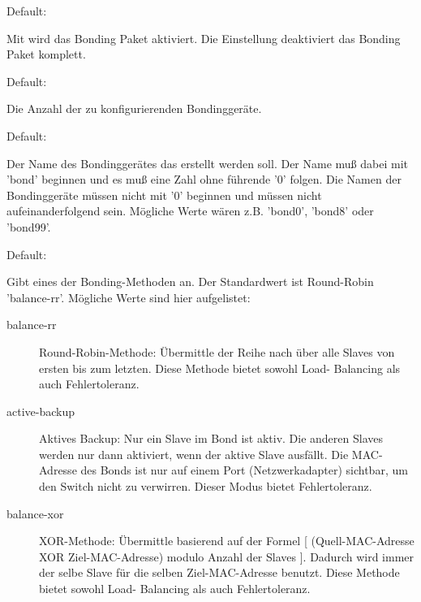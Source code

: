 \begin{description}


  Default: 

  Mit  wird das Bonding Paket aktiviert. Die Einstellung
   deaktiviert das Bonding Paket komplett.


  Default: 

  Die Anzahl der zu konfigurierenden Bondinggeräte.


  Default: 

  Der Name des Bondinggerätes das erstellt werden soll. Der Name muß
  dabei mit 'bond' beginnen und es muß eine Zahl ohne führende '0'
  folgen. Die Namen der Bondinggeräte müssen nicht mit '0' beginnen
  und müssen nicht aufeinanderfolgend sein. Mögliche Werte wären
  z.B. 'bond0', 'bond8' oder 'bond99'.


  Default: 

  Gibt eines der Bonding-Methoden an. Der Standardwert ist Round-Robin
  'balance-rr'. Mögliche Werte sind hier aufgelistet: 

\begin{description}

\item [balance-rr]

  Round-Robin-Methode: Übermittle der Reihe nach über alle Slaves von
  ersten bis zum letzten. Diese Methode bietet sowohl Load- Balancing
  als auch Fehlertoleranz.

\item [active-backup]

  Aktives Backup: Nur ein Slave im Bond ist aktiv. Die anderen Slaves
  werden nur dann aktiviert, wenn der aktive Slave ausfällt. Die
  MAC-Adresse des Bonds ist nur auf einem Port (Netzwerkadapter)
  sichtbar, um den Switch nicht zu verwirren.  Dieser Modus bietet
  Fehlertoleranz.

\item [balance-xor]

  XOR-Methode: Übermittle basierend auf der Formel [
  (Quell-MAC-Adresse XOR Ziel-MAC-Adresse) modulo Anzahl der Slaves
  ]. Dadurch wird immer der selbe Slave für die selben
  Ziel-MAC-Adresse benutzt. Diese Methode bietet sowohl Load-
  Balancing als auch Fehlertoleranz.


\end{description}
\end{description}

